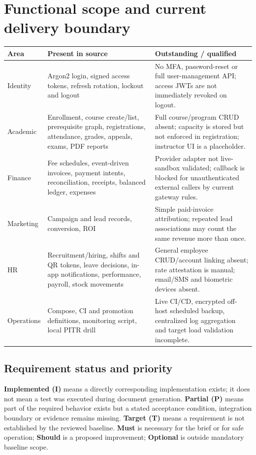\documentclass[10pt,a4paper]{article}
\begin{document}
\clearpage
\section{Functional scope and current delivery boundary}
\begin{tabularx}{\textwidth}{@{}L{29mm}Y Y@{}}
\toprule Area & Present in source & Outstanding / qualified\\\midrule
Identity & Argon2 login, signed access tokens, refresh rotation, lockout and logout & No MFA, password-reset or full user-management API; access JWTs are not immediately revoked on logout.\\
Academic & Enrollment, course create/list, prerequisite graph, registrations, attendance, grades, appeals, exams, PDF reports & Full course/program CRUD absent; capacity is stored but not enforced in registration; instructor UI is a placeholder.\\
Finance & Fee schedules, event-driven invoices, payment intents, reconciliation, receipts, balanced ledger, expenses & Provider adapter not live-sandbox validated; callback is blocked for unauthenticated external callers by current gateway rules.\\
Marketing & Campaign and lead records, conversion, ROI & Simple paid-invoice attribution; repeated lead associations may count the same revenue more than once.\\
HR & Recruitment/hiring, shifts and QR tokens, leave decisions, in-app notifications, performance, payroll, stock movements & General employee CRUD/account linking absent; rate attestation is manual; email/SMS and biometric devices absent.\\
Operations & Compose, CI and promotion definitions, monitoring script, local PITR drill & Live CI/CD, encrypted off-host scheduled backup, centralized log aggregation and target load validation incomplete.\\
\bottomrule
\end{tabularx}
\subsection{Requirement status and priority}
\textbf{Implemented (I)} means a directly corresponding implementation exists;
it does not mean a test was executed during document generation.
\textbf{Partial (P)} means part of the required behavior exists but a stated
acceptance condition, integration boundary or evidence remains missing.
\textbf{Target (T)} means a requirement is not established by the reviewed baseline.
\textbf{Must} is necessary for the brief or for safe operation; \textbf{Should}
is a proposed improvement; \textbf{Optional} is outside mandatory baseline scope.
\end{document}
